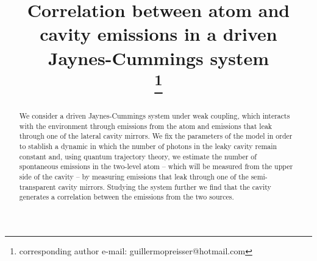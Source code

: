 \documentclass[conference]{IEEEtran}
\begin{document}
\title{Correlation between atom and cavity emissions in a driven Jaynes-Cummings system\\
\thanks{corresponding author e-mail: guillermopreisser@hotmail.com}
}

\author{
}

\maketitle

\begin{abstract}
We consider a driven Jaynes-Cummings system under weak coupling, which interacts with the environment through emissions from the atom and emissions that leak through one of the lateral cavity mirrors.  We fix the parameters of the model in order to stablish a dynamic in which the number of photons in the leaky cavity remain constant and, using quantum trajectory theory, we estimate the number of spontaneous emissions in the two-level atom – which will be measured from the upper side of the cavity – by measuring emissions that leak through one of the semi-transparent cavity mirrors. Studying the system further we find that the cavity generates a correlation between the emissions from the two sources.
\end{abstract}

\end{document}
